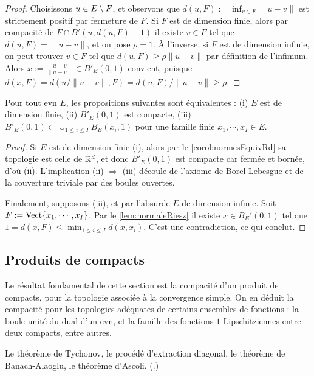 \begin{proof}
	Choisissons $u \in E \setminus F$, et observons que $d(u,F) := \inf_{v \in F} \|u-v\|$ est strictement positif par fermeture de $F$. 
	Si $F$ est de dimension finie, alors par compacité de $F \cap B'(u,d(u,F)+1)$ il existe $v \in F$ tel que $d(u,F) = \|u-v\|$, et on pose $\rho=1$. À l'inverse, si $F$ est de dimension infinie, on peut trouver $v \in F$ tel que $d(u,F) \geq \rho\|u-v\|$ par définition de l'infimum. 
	Alors $x := \frac{u-v}{\|u-v\|} \in B'_E(0,1)$ convient, puisque $d(x,F) =  d(u/\|u-v\|,F) = d(u,F)/\|u-v\| \geq \rho$. 
\end{proof}

\begin{theorem}
\label{th:bouleCompRiesz}
%
Pour tout evn $E$, les propositions suivantes sont équiva\-lentes : (i) $E$ est de dimension finie, (ii) $B'_E(0,1)$ est compacte, (iii) $B'_E(0,1) \subset \cup_{1 \leq i \leq I} B_E(x_i,1)$ pour une famille finie $x_1,\cdots,x_I \in E$. 
\end{theorem}

\begin{proof}
	Si $E$ est de dimension finie (i), alors par le \cref{corol:normesEquivRd} sa topologie est celle de $\mathbb{R}^d$, et donc $B'_E(0,1)$ est compacte car fermée et bornée, d'où (ii). L'implication (ii) $\Rightarrow$ (iii) découle de l'axiome de Borel-Lebesgue et de la couverture triviale par des boules ouvertes.
	
		Finalement, supposons (iii), et par l'absurde $E$ de dimension infinie. Soit $F := \operatorname{Vect}\{x_1,\cdots,x_I\}$. Par le \cref{lem:normaleRiesz} il existe $x \in B_E'(0,1)$ tel que $1 = d(x,F) \leq \min_{1 \leq i \leq I} d(x,x_i)$. C'est une contradiction, ce qui conclut. 
\end{proof}


\subsection{Produits de compacts}
\label{subsec:compactProd}

Le résultat fondamental de cette section est la compacité d'un produit de compacts, pour la topologie associée à la convergence simple. On en déduit la compacité pour les topologies adéquates de certains ensembles de fonctions : la boule unité du dual d'un evn, et la famille des fonctions $1$-Lipschitziennes entre deux compacts, entre autres. %

\begin{retenir}
Le théorème de Tychonov, le procédé d'extraction diagonal, le théorème de Banach-Alaoglu, le théorème d'Ascoli.
(.)
\end{retenir}



